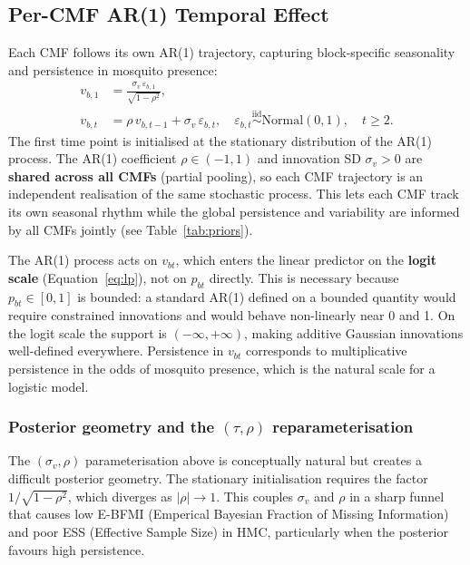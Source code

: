 \documentclass[12pt,a4paper]{article}
\begin{document}
\subsection{Per-CMF AR(1) Temporal Effect}
\label{sec:ar}

Each CMF follows its own AR(1) trajectory, capturing block-specific seasonality and persistence
in mosquito presence:
\begin{align}
  v_{b,1} &= \frac{\sigma_v\, \varepsilon_{b,1}}{\sqrt{1 - \rho^2}}, \\
  v_{b,t} &= \rho\, v_{b,t-1} + \sigma_v\, \varepsilon_{b,t}, \quad \varepsilon_{b,t} \overset{\text{iid}}{\sim} \text{Normal}(0,1), \quad t \geq 2.
\end{align}
The first time point is initialised at the stationary distribution of the AR(1) process.
The AR(1) coefficient $\rho \in (-1,1)$ and innovation SD $\sigma_v > 0$ are \textbf{shared across
all CMFs} (partial pooling), so each CMF trajectory is an independent realisation of the same
stochastic process. This lets each CMF track its own seasonal rhythm while the global persistence
and variability are informed by all CMFs jointly (see Table~\ref{tab:priors}).

The AR(1) process acts on $v_{bt}$, which enters the linear predictor on the \textbf{logit scale} (Equation~\ref{eq:lp}), not on $p_{bt}$ directly. This is necessary because $p_{bt} \in [0,1]$ is bounded: a standard AR(1) defined on a bounded quantity would require constrained innovations and would behave non-linearly near 0 and 1. On the logit scale the support is $(-\infty, +\infty)$, making additive Gaussian innovations well-defined everywhere. Persistence in $v_{bt}$ corresponds to multiplicative persistence in the odds of mosquito presence, which is the natural scale for a logistic model.

\subsubsection*{Posterior geometry and the $(\tau, \rho)$ reparameterisation}

The $(\sigma_v, \rho)$ parameterisation above is conceptually natural but creates a
difficult posterior geometry. The stationary initialisation requires the factor
$1/\sqrt{1-\rho^2}$, which diverges as $|\rho| \to 1$. This couples $\sigma_v$ and $\rho$ in a
sharp funnel that causes low E-BFMI (Emperical Bayesian Fraction of Missing Information) and poor ESS (Effective Sample Size) in HMC, particularly when the posterior
favours high persistence.
\end{document}
